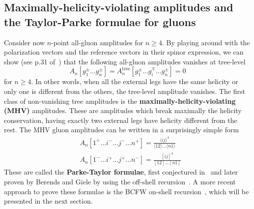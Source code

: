 \subsection*{Maximally-helicity-violating amplitudes and the Taylor-Parke formulae for gluons}
Consider now $n$-point all-gluon amplitudes for $n\geq 4$. 
By playing around with the polarization vectors and the reference vectors in their spinor expression, we can show (see p.31 of~\cite{Elvang:2013cua}) that the following all-gluon amplitudes vanishes at tree-level
\begin{equation*}
A_n[g_1^\pm \ldots g_n^\pm] = A^{\mathrm{tree}}_n[g_1^\pm \ldots g_i^\mp \ldots g_n^\pm] = 0
\end{equation*}
for $n\geq 4$.
In other words, when all the external legs have the same helicity or only one is different from the others, the tree-level amplitude vanishes.
The first class of non-vanishing tree amplitudes is the \textbf{maximally-helicity-violating (MHV)} amplitudes.
These are amplitudes which break maximally the helicity conservation, having exactly two external legs have helicity different from the rest.
The MHV gluon amplitudes can be written in a surprisingly simple form
\begin{equation*}
\begin{split}
& A_n[1^+\ldots i^-\ldots j^-\ldots n^+] = 
\frac{\langle ij \rangle^4}{\langle 12 \rangle\ldots \langle n1 \rangle}
\\
& A_n[1^-\ldots i^+\ldots j^+\ldots n^-] = 
\frac{[ ij]^4}{[ 12 ]\ldots [n1 ]}
\end{split}
\end{equation*}
These are called the \textbf{Parke-Taylor formulae}, first conjectured in~\cite{PhysRevLett.56.2459} and later proven by Berends and Giele by using the off-shell recursion~\cite{BERENDS1988759}. 
A more recent approach to prove these formulae is the BCFW on-shell recursion~\cite{BRITTO2005499, PhysRevLett.94.181602}, which will be presented in the next section. 







